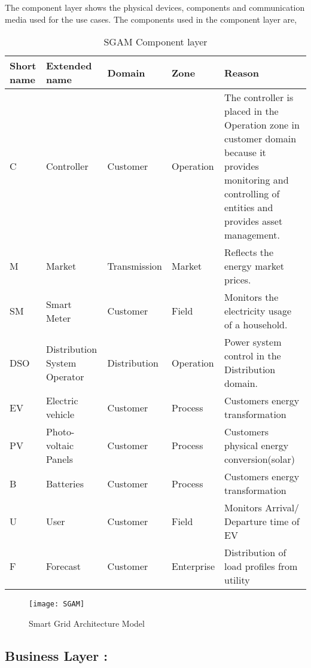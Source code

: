 The component layer shows the physical devices, components and communication media used
for the use cases. The components used in the component layer are,

\begin{table}[h!b]
	\centering
	\begin{tabular} { | p{1cm} | p{2.5cm} | l | l | p{8cm} | }
    \hline
		\textbf{Short name} & \textbf{Extended name} & \textbf{Domain} & \textbf{Zone} & \textbf{Reason} \\ 
		\hline
		C & Controller & Customer & Operation & The controller is placed in the Operation zone in customer domain because it provides monitoring and controlling of entities and provides asset management.\\ 
		\hline
		M & Market & Transmission & Market & Reflects the energy market prices. \\ 
        \hline
        SM & Smart Meter & Customer & Field & Monitors the electricity usage of a household. \\ 
		\hline
        DSO & Distribution System Operator & Distribution & Operation &  Power system control in the Distribution domain. \\ 
		\hline
        EV & Electric vehicle & Customer & Process &  Customers energy transformation \\
		\hline
        PV & Photo-voltaic Panels & Customer & Process & Customers physical energy conversion(solar) \\ 
		\hline
        B & Batteries & Customer & Process & Customers energy transformation  \\
		\hline
        U & User & Customer & Field & Monitors Arrival/ Departure time of EV \\ 
		\hline
        F & Forecast & Customer & Enterprise & Distribution of load profiles from utility \\ 
		\hline
	\end{tabular}
    \caption{SGAM Component layer}
    \label{table:4} 
\end{table}
\begin{figure}[htb]
	\centering
	\texttt{[image: SGAM]}
	\caption{Smart Grid Architecture Model }
	\label{fig:Smart Grid Architecture Model }
\end{figure}

\subsection{Business Layer :}

